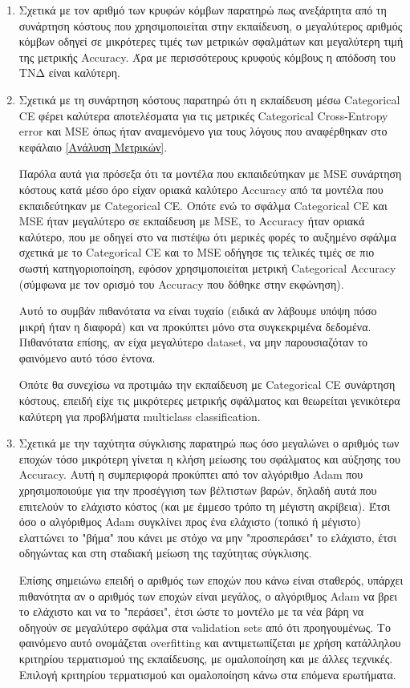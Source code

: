 \documentclass[12pt,a4paper]{article}
\begin{document}
\begin{enumerate}
    \item Σχετικά με τον αριθμό των κρυφών κόμβων παρατηρώ πως ανεξάρτητα από τη συνάρτηση κόστους που χρησιμοποιείται στην εκπαίδευση, ο μεγαλύτερος αριθμός κόμβων οδηγεί σε μικρότερες τιμές των μετρικών σφαλμάτων και μεγαλύτερη τιμή της μετρικής Accuracy. Άρα με περισσότερους κρυφούς κόμβους η απόδοση του ΤΝΔ είναι καλύτερη.
    \item Σχετικά με τη συνάρτηση κόστους παρατηρώ ότι η εκπαίδευση μέσω Categorical CE φέρει καλύτερα αποτελέσματα για τις μετρικές Categorical Cross-Entropy error και MSE όπως ήταν αναμενόμενο για τους λόγους που αναφέρθηκαν στο κεφάλαιο \ref{Ανάλυση Μετρικών}. 

        Παρόλα αυτά για πρόσεξα ότι τα μοντέλα που εκπαιδεύτηκαν με MSE συνάρτηση κόστους κατά μέσο όρο είχαν οριακά καλύτερο Accuracy από τα μοντέλα που εκπαιδεύτηκαν με Categorical CE. Οπότε ενώ το σφάλμα Categorical CE και MSE ήταν μεγαλύτερο σε εκπαίδευση με MSE, το Accuracy ήταν οριακά καλύτερο, που με οδηγεί στο να πιστέψω ότι μερικές φορές το αυξημένο σφάλμα σχετικά με το Categorical CE και το MSE οδήγησε τις τελικές τιμές σε πιο σωστή κατηγοριοποίηση, εφόσον χρησιμοποιείται μετρική Categorical Accuracy (σύμφωνα με τον ορισμό του Accuracy που δόθηκε στην εκφώνηση). 

        Αυτό το συμβάν πιθανότατα να είναι τυχαίο (ειδικά αν λάβουμε υπόψη πόσο μικρή ήταν η διαφορά) και να προκύπτει μόνο στα συγκεκριμένα δεδομένα. Πιθανότατα επίσης, αν είχα μεγαλύτερο dataset, να μην παρουσιαζόταν το φαινόμενο αυτό τόσο έντονα.

        Οπότε θα συνεχίσω να προτιμάω την εκπαίδευση με Categorical CE συνάρτηση κόστους, επειδή είχε τις μικρότερες μετρικής σφάλματος και θεωρείται γενικότερα καλύτερη για προβλήματα multiclass classification.
    \item Σχετικά με την ταχύτητα σύγκλισης παρατηρώ πως όσο μεγαλώνει ο αριθμός των εποχών τόσο μικρότερη γίνεται η κλήση μείωσης του σφάλματος και αύξησης του Accuracy. Αυτή η συμπεριφορά προκύπτει από τον αλγόριθμο Adam που χρησιμοποιούμε για την προσέγγιση των βέλτιστων βαρών, δηλαδή αυτά που επιτελούν το ελάχιστο κόστος (και με έμμεσο τρόπο τη μέγιστη ακρίβεια). Έτσι όσο ο αλγόριθμος Adam συγκλίνει προς ένα ελάχιστο (τοπικό ή μέγιστο) ελαττώνει το "βήμα" που κάνει με στόχο να μην "προσπεράσει" το ελάχιστο, έτσι οδηγώντας και στη σταδιακή μείωση της ταχύτητας σύγκλισης.

        Επίσης σημειώνω επειδή ο αριθμός των εποχών που κάνω είναι σταθερός, υπάρχει πιθανότητα αν ο αριθμός των εποχών είναι μεγάλος, ο αλγόριθμος Adam να βρει το ελάχιστο και να το "περάσει", έτσι ώστε το μοντέλο με τα νέα βάρη να οδηγούν σε μεγαλύτερο σφάλμα στα validation sets από ότι προηγουμένως. Το φαινόμενο αυτό ονομάζεται overfitting και αντιμετωπίζεται με χρήση κατάλληλου κριτηρίου τερματισμού της εκπαίδευσης, με ομαλοποίηση και με άλλες τεχνικές. Επιλογή κριτηρίου τερματισμού και ομαλοποίηση κάνω στα επόμενα ερωτήματα.
        
\end{enumerate}
\end{document}
